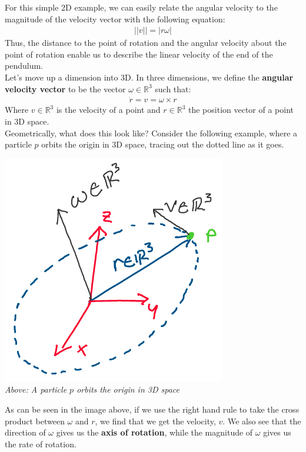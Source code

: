 \documentclass[oneside]{book}
\begin{document}
For this simple 2D example, we can easily relate the angular velocity to the magnitude of the velocity vector with the following equation:
\begin{align}
    ||v|| = |r\omega|
\end{align}
Thus, the distance to the point of rotation and the angular velocity about the point of rotation enable us to describe the linear velocity of the end of the pendulum.\\
Let's move up a dimension into 3D. In three dimensions, we define the \textbf{angular velocity vector} to be the vector $\omega \in \mathbb{R}^3$ such that:
\begin{align}
    \dot{r} = v = \omega\times r
\end{align}
Where $v\in \mathbb{R}^3$ is the velocity of a point and $r\in \mathbb{R}^3$ the position vector of a point in 3D space.\\
Geometrically, what does this look like? Consider the following example, where a particle $p$ orbits the origin in 3D space, tracing out the dotted line as it goes.
\begin{center}
    \includegraphics[scale=0.5]{images/3dangvel.png}\\
    \textit{Above: A particle $p$ orbits the origin in 3D space}
\end{center}
As can be seen in the image above, if we use the right hand rule to take the cross product between $\omega$ and $r$, we find that we get the velocity, $v$. We also see that the direction of $\omega$ gives us the \textbf{axis of rotation}, while the magnitude of $\omega$ gives us the rate of rotation.\\
\end{document}
